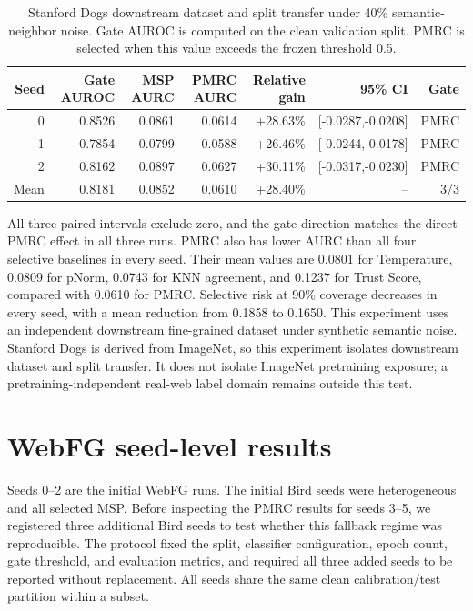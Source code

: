\documentclass[11pt,a4paper]{article}
\begin{document}
\begin{table}[H]
\centering
\caption{Stanford Dogs downstream dataset and split transfer under 40\% semantic-neighbor
noise. Gate AUROC is computed on the clean validation split. PMRC is selected
when this value exceeds the frozen threshold 0.5.}
\label{tab:stanford-dogs-external}
\small
\begin{tabular}{@{}rrrrrrr@{}}
\toprule
Seed & Gate AUROC & MSP AURC & PMRC AURC & Relative gain & 95\% CI & Gate \\
\midrule
0 & 0.8526 & 0.0861 & 0.0614 & +28.63\% & [-0.0287,-0.0208] & PMRC \\
1 & 0.7854 & 0.0799 & 0.0588 & +26.46\% & [-0.0244,-0.0178] & PMRC \\
2 & 0.8162 & 0.0897 & 0.0627 & +30.11\% & [-0.0317,-0.0230] & PMRC \\
Mean & 0.8181 & 0.0852 & 0.0610 & +28.40\% & -- & 3/3 \\
\bottomrule
\end{tabular}
\end{table}

All three paired intervals exclude zero, and the gate direction matches the
direct PMRC effect in all three runs. PMRC also has lower AURC than all four
selective baselines in every seed. Their mean values are 0.0801 for
Temperature, 0.0809 for pNorm, 0.0743 for KNN agreement, and 0.1237 for Trust
Score, compared with 0.0610 for PMRC. Selective risk at 90\% coverage decreases
in every seed, with a mean reduction from 0.1858 to 0.1650. This experiment
uses an independent downstream fine-grained dataset under synthetic semantic
noise. Stanford Dogs is derived from ImageNet, so this experiment isolates
downstream dataset and split transfer. It does not isolate ImageNet pretraining
exposure; a pretraining-independent real-web label domain remains outside this
test.

\section{WebFG seed-level results}

Seeds 0--2 are the initial WebFG runs. The initial Bird seeds were heterogeneous
and all selected MSP. Before inspecting the PMRC results for seeds 3--5, we
registered three additional Bird seeds to test whether this fallback regime was
reproducible. The protocol fixed the split, classifier configuration, epoch
count, gate threshold, and evaluation metrics, and required all three added
seeds to be reported without replacement. All seeds share the same clean
calibration/test partition within a subset.
\end{document}
